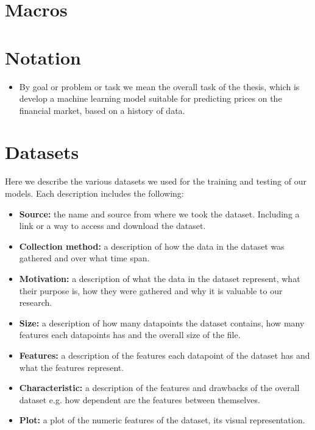\section{Macros}

\section{Notation}
\begin{itemize}
	\item By goal or problem or task we mean the overall task of the thesis, which is develop a machine learning model suitable for predicting prices on the financial market, based on a history of data.
\end{itemize}

\section{Datasets}
Here we describe the various datasets we used for the training and testing of our models. Each description includes the following:
\begin{itemize}
	\item \textbf{Source:} the name and source from where we took the dataset. Including a link or a way to access and download the dataset.
	\item \textbf{Collection method:} a description of how the data in the dataset was gathered and over what time span.
	\item \textbf{Motivation:} a description of what the data in the dataset represent, what their purpose is, how they were gathered and why it is valuable to our research.
	\item \textbf{Size:} a description of how many datapoints the dataset contains, how many features each datapoints has and the overall size of the file.
	\item \textbf{Features:} a description of the features each datapoint of the dataset has and what the features represent.
	\item \textbf{Characteristic:} a description of the features and drawbacks of the overall dataset e.g. how dependent are the features between themselves.
	\item \textbf{Plot:} a plot of the numeric features of the dataset, its visual representation.
\end{itemize}

